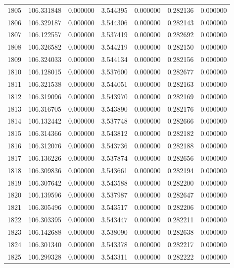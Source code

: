 \begin{tabular}{rrrrrrr}
1805 & 106.331848 &    0.000000 &  3.544395 &    0.000000 &    0.282136 &  0.000000 \\
1806 & 106.329187 &    0.000000 &  3.544306 &    0.000000 &    0.282143 &  0.000000 \\
1807 & 106.122557 &    0.000000 &  3.537419 &    0.000000 &    0.282692 &  0.000000 \\
1808 & 106.326582 &    0.000000 &  3.544219 &    0.000000 &    0.282150 &  0.000000 \\
1809 & 106.324033 &    0.000000 &  3.544134 &    0.000000 &    0.282156 &  0.000000 \\
1810 & 106.128015 &    0.000000 &  3.537600 &    0.000000 &    0.282677 &  0.000000 \\
1811 & 106.321538 &    0.000000 &  3.544051 &    0.000000 &    0.282163 &  0.000000 \\
1812 & 106.319096 &    0.000000 &  3.543970 &    0.000000 &    0.282169 &  0.000000 \\
1813 & 106.316705 &    0.000000 &  3.543890 &    0.000000 &    0.282176 &  0.000000 \\
1814 & 106.132442 &    0.000000 &  3.537748 &    0.000000 &    0.282666 &  0.000000 \\
1815 & 106.314366 &    0.000000 &  3.543812 &    0.000000 &    0.282182 &  0.000000 \\
1816 & 106.312076 &    0.000000 &  3.543736 &    0.000000 &    0.282188 &  0.000000 \\
1817 & 106.136226 &    0.000000 &  3.537874 &    0.000000 &    0.282656 &  0.000000 \\
1818 & 106.309836 &    0.000000 &  3.543661 &    0.000000 &    0.282194 &  0.000000 \\
1819 & 106.307642 &    0.000000 &  3.543588 &    0.000000 &    0.282200 &  0.000000 \\
1820 & 106.139596 &    0.000000 &  3.537987 &    0.000000 &    0.282647 &  0.000000 \\
1821 & 106.305496 &    0.000000 &  3.543517 &    0.000000 &    0.282206 &  0.000000 \\
1822 & 106.303395 &    0.000000 &  3.543447 &    0.000000 &    0.282211 &  0.000000 \\
1823 & 106.142688 &    0.000000 &  3.538090 &    0.000000 &    0.282638 &  0.000000 \\
1824 & 106.301340 &    0.000000 &  3.543378 &    0.000000 &    0.282217 &  0.000000 \\
1825 & 106.299328 &    0.000000 &  3.543311 &    0.000000 &    0.282222 &  0.000000 \\

\end{tabular}
